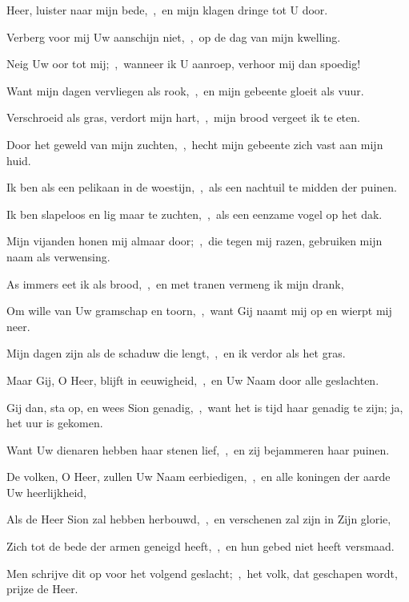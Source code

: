 \documentclass[12pt,twoside,a5paper]{article}
\begin{document}
\begin{halfparskip}

   Heer, luister naar mijn bede,~\sep\ en mijn klagen dringe tot U door.


  Verberg voor mij Uw aanschijn niet,~\sep\ op de dag van mijn kwelling.

  Neig Uw oor tot mij;~\sep\ wanneer ik U aanroep, verhoor mij dan spoedig!

  Want mijn dagen vervliegen als rook,~\sep\ en mijn gebeente gloeit als vuur.

  Verschroeid als gras, verdort mijn hart,~\sep\ mijn brood vergeet ik te eten.

  Door het geweld van mijn zuchten,~\sep\ hecht mijn gebeente zich vast aan mijn huid.

  Ik ben als een pelikaan in de woestijn,~\sep\ als een nachtuil te midden der puinen.

  Ik ben slapeloos en lig maar te zuchten,~\sep\ als een eenzame vogel op het dak.

  Mijn vijanden honen mij almaar door;~\sep\ die tegen mij razen, gebruiken mijn naam als verwensing.

  As immers eet ik als brood,~\sep\ en met tranen vermeng ik mijn drank,

  Om wille van Uw gramschap en toorn,~\sep\ want Gij naamt mij op en wierpt mij neer.

  Mijn dagen zijn als de schaduw die lengt,~\sep\ en ik verdor als het gras.

  Maar Gij, O Heer, blijft in eeuwigheid,~\sep\ en Uw Naam door alle geslachten.

  Gij dan, sta op, en wees Sion genadig,~\sep\ want het is tijd haar genadig te zijn; ja, het uur is gekomen.

  Want Uw dienaren hebben haar stenen lief,~\sep\ en zij bejammeren haar puinen.

  De volken, O Heer, zullen Uw Naam eerbiedigen,~\sep\ en alle koningen der aarde Uw heerlijkheid,

  Als de Heer Sion zal hebben herbouwd,~\sep\ en verschenen zal zijn in Zijn glorie,

  Zich tot de bede der armen geneigd heeft,~\sep\ en hun gebed niet heeft versmaad.

  Men schrijve dit op voor het volgend geslacht;~\sep\ het volk, dat geschapen wordt, prijze de Heer.


\end{halfparskip}
\end{document}
